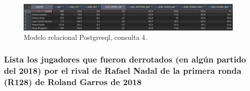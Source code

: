 \begin{figure}[H]
\centering
\includegraphics[width=\textwidth]{fotos/q4_rel.png}
\caption{Modelo relacional Postgresql, consulta 4.}
\label{fig:q4_rel}
\end{figure}

\subsubsection{Lista los jugadores que fueron derrotados (en algún partido del 2018) por el rival de Rafael Nadal de la primera ronda (R128) de Roland Garros de 2018}


